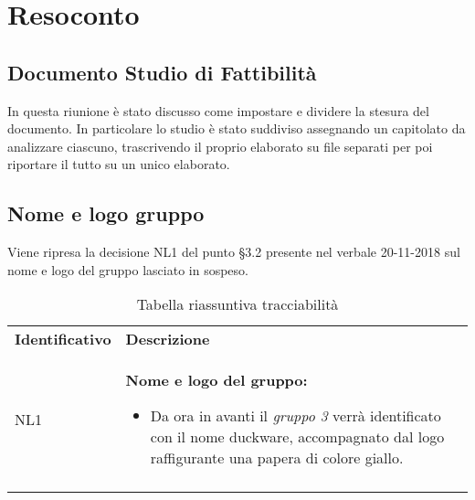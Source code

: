 \clearpage
\section{Resoconto}
	\subsection{Documento Studio di Fattibilità}
	In questa riunione è stato discusso come impostare e dividere la stesura del documento. In particolare lo studio è stato suddiviso assegnando un capitolato da analizzare ciascuno, trascrivendo il proprio elaborato su file separati per poi riportare il tutto su un unico elaborato. 
	
	\subsection{Nome e logo gruppo}
	Viene ripresa la decisione NL1 del punto §3.2 presente nel verbale 20-11-2018 sul nome e logo del gruppo lasciato in sospeso.
	
	
	\begin{center}
		\renewcommand{\arraystretch}{1.5}
		\begin{longtable}{  p{3cm} p{11.2cm}  }
			\rowcolor{tableHeadYellow}
			\textbf{Identificativo} & \textbf{Descrizione}\\
			NL1 & 	 	\textbf{Nome e logo del gruppo:}
			\begin{itemize}
				\item Da ora in avanti il \emph{gruppo 3} verrà identificato con il nome duckware, accompagnato dal logo raffigurante una papera di colore giallo.
			\end{itemize}
			\\			
			
			\rowcolor{white}
			\caption{Tabella riassuntiva tracciabilità}
		\end{longtable}	
	\end{center}
	
